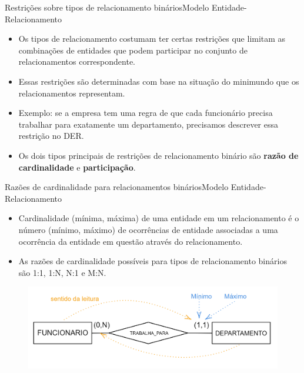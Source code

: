 \documentclass[t]{beamer}
\begin{document}
\begin{ftst}{Restrições sobre tipos de relacionamento binários}{Modelo Entidade-Relacionamento}
\begin{itemize}
    \item Os tipos de relacionamento costumam ter certas restrições que limitam as combinações de entidades que podem participar no conjunto de relacionamentos correspondente.
    \item Essas restrições são determinadas com base na situação do minimundo que os relacionamentos representam. 
    \item Exemplo: se a empresa tem uma regra de que cada funcionário precisa trabalhar para exatamente um departamento, precisamos descrever essa restrição no DER.
    \item Os dois tipos principais de restrições de relacionamento binário são \textbf{razão de
cardinalidade} e \textbf{participação}.
\end{itemize}


\end{ftst}


\begin{ftst}{Razões de cardinalidade para relacionamentos binários}{Modelo Entidade-Relacionamento}
\begin{itemize}
    \item Cardinalidade (mínima, máxima) de uma entidade em um relacionamento é o número (mínimo, máximo) de ocorrências de entidade associadas a uma ocorrência da entidade em questão através do relacionamento.
    \item As razões de cardinalidade possíveis para tipos de relacionamento binários são 1:1, 1:N, N:1 e M:N.
\end{itemize}
\begin{figure}
    \centering
    \includegraphics[scale=0.2]{Figuras/01_13.png}
\end{figure}
\end{ftst}

\end{document}

